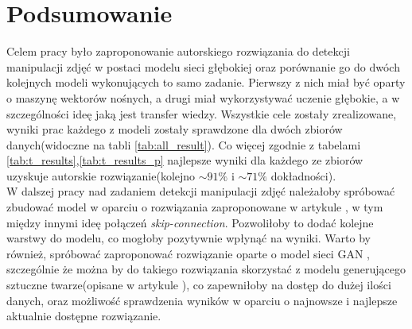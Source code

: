 \chapter{Podsumowanie}

Celem pracy było zaproponowanie autorskiego rozwiązania do detekcji manipulacji zdjęć w postaci modelu sieci głębokiej oraz porównanie go do dwóch kolejnych modeli wykonujących to samo zadanie. Pierwszy z nich miał być oparty o maszynę wektorów nośnych, a drugi miał wykorzystywać uczenie głębokie, a w szczególności ideę jaką jest transfer wiedzy. Wszystkie cele zostały zrealizowane, wyniki prac każdego z modeli zostały sprawdzone dla dwóch zbiorów danych(widoczne na tabli \ref{tab:all_result}). Co więcej zgodnie z tabelami \ref{tab:t_results},\ref{tab:t_results_p} najlepsze wyniki dla każdego ze zbiorów uzyskuje autorskie rozwiązanie(kolejno $\sim91\%$ i $\sim71\%$ dokładności). \\

W dalszej pracy nad zadaniem detekcji manipulacji zdjęć należałoby spróbować zbudować model w oparciu o rozwiązania zaproponowane w artykule \cite{resnet}, w tym między innymi ideę połączeń \textit{skip-connection}. Pozwoliłoby to dodać kolejne warstwy do modelu, co mogłoby pozytywnie wpłynąć na wyniki. Warto by również, spróbować zaproponować rozwiązanie oparte o model sieci GAN \cite{orggan}, szczególnie że można by do takiego rozwiązania skorzystać z modelu generującego sztuczne twarze(opisane w artykule \cite{gan}), co zapewniłoby na dostęp do dużej ilości danych, oraz możliwość sprawdzenia wyników w oparciu o najnowsze i najlepsze aktualnie dostępne rozwiązanie.
